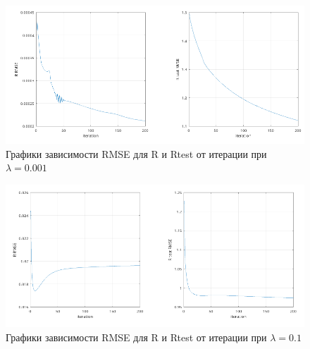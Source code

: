 \documentclass{article}
\begin{document}
    
    \begin{figure}
        \includegraphics[width=\linewidth]{Plots/RMSE_0_001.png}
        \caption{Графики зависимости RMSE для R и R\textunderscore test от итерации при $\lambda = 0.001$}
    \end{figure}
    
    \begin{figure}
        \includegraphics[width=\linewidth]{Plots/RMSE_0_1.png}
        \caption{Графики зависимости RMSE для R и R\textunderscore test от итерации при $\lambda = 0.1$}
    \end{figure}
\end{document}
